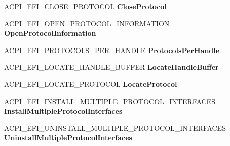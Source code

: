 \begin{DoxyCompactItemize}
A\+C\+P\+I\+\_\+\+E\+F\+I\+\_\+\+C\+L\+O\+S\+E\+\_\+\+P\+R\+O\+T\+O\+C\+OL {\bfseries Close\+Protocol}
\item 
\mbox{\label{struct___a_c_p_i___e_f_i___b_o_o_t___s_e_r_v_i_c_e_s_a82255ccd50adb13cf699c4157b500f44}} 
A\+C\+P\+I\+\_\+\+E\+F\+I\+\_\+\+O\+P\+E\+N\+\_\+\+P\+R\+O\+T\+O\+C\+O\+L\+\_\+\+I\+N\+F\+O\+R\+M\+A\+T\+I\+ON {\bfseries Open\+Protocol\+Information}
\item 
\mbox{\label{struct___a_c_p_i___e_f_i___b_o_o_t___s_e_r_v_i_c_e_s_a0eefb4933bcfc6668d067503c446d384}} 
A\+C\+P\+I\+\_\+\+E\+F\+I\+\_\+\+P\+R\+O\+T\+O\+C\+O\+L\+S\+\_\+\+P\+E\+R\+\_\+\+H\+A\+N\+D\+LE {\bfseries Protocols\+Per\+Handle}
\item 
\mbox{\label{struct___a_c_p_i___e_f_i___b_o_o_t___s_e_r_v_i_c_e_s_ad43aa8ffa8eca853987c7f9ff8e322d3}} 
A\+C\+P\+I\+\_\+\+E\+F\+I\+\_\+\+L\+O\+C\+A\+T\+E\+\_\+\+H\+A\+N\+D\+L\+E\+\_\+\+B\+U\+F\+F\+ER {\bfseries Locate\+Handle\+Buffer}
\item 
\mbox{\label{struct___a_c_p_i___e_f_i___b_o_o_t___s_e_r_v_i_c_e_s_a56c2b264376bdd735c1a9018f49fc551}} 
A\+C\+P\+I\+\_\+\+E\+F\+I\+\_\+\+L\+O\+C\+A\+T\+E\+\_\+\+P\+R\+O\+T\+O\+C\+OL {\bfseries Locate\+Protocol}
\item 
\mbox{\label{struct___a_c_p_i___e_f_i___b_o_o_t___s_e_r_v_i_c_e_s_a33c7ef1c438ed9286acefb24fac84710}} 
A\+C\+P\+I\+\_\+\+E\+F\+I\+\_\+\+I\+N\+S\+T\+A\+L\+L\+\_\+\+M\+U\+L\+T\+I\+P\+L\+E\+\_\+\+P\+R\+O\+T\+O\+C\+O\+L\+\_\+\+I\+N\+T\+E\+R\+F\+A\+C\+ES {\bfseries Install\+Multiple\+Protocol\+Interfaces}
\item 
\mbox{\label{struct___a_c_p_i___e_f_i___b_o_o_t___s_e_r_v_i_c_e_s_acf4fd12ef15963c7ded8ab3bc9e59fef}} 
A\+C\+P\+I\+\_\+\+E\+F\+I\+\_\+\+U\+N\+I\+N\+S\+T\+A\+L\+L\+\_\+\+M\+U\+L\+T\+I\+P\+L\+E\+\_\+\+P\+R\+O\+T\+O\+C\+O\+L\+\_\+\+I\+N\+T\+E\+R\+F\+A\+C\+ES {\bfseries Uninstall\+Multiple\+Protocol\+Interfaces}
\item 
\mbox{\label{struct___a_c_p_i___e_f_i___b_o_o_t___s_e_r_v_i_c_e_s_a59135e456ba6bf87b343c716a0b77b32}} 

\end{DoxyCompactItemize}
